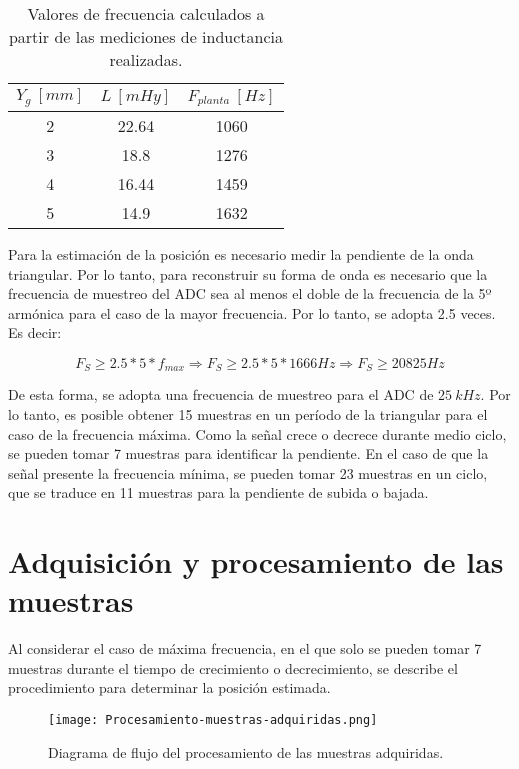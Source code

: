 \begin{table}[H]
	\begin{center}
		\begin{tabular}{| c | c | c |}
			\hline
			$Y_g\:[mm]$ & $L\:[mHy]$ & $F_{planta}\:[Hz]$\\ \hline
			2 & 22.64 & 1060\\ \hline
			3 & 18.8 & 1276\\ \hline
			4 & 16.44 & 1459\\ \hline
			5 & 14.9 & 1632\\ \hline
		\end{tabular}
		\caption{Valores de frecuencia calculados a partir de las mediciones de inductancia realizadas.}
		\label{frecuencias-calculadas}
	\end{center}
\end{table}


\noindent Para la estimación de la posición es necesario medir la pendiente de la onda triangular. Por lo tanto, para reconstruir su forma de onda es necesario que la frecuencia de muestreo del ADC sea al menos el doble de la frecuencia de la 5º armónica para el caso de la mayor frecuencia. Por lo tanto, se adopta 2.5 veces. Es decir:

\begin{equation} 
	F_S \geq 2.5 * 5 * f_{max} \Rightarrow  F_S \geq 2.5 * 5 * 1666 Hz \Rightarrow F_S \geq 20825 Hz
\end{equation}

\noindent De esta forma, se adopta una frecuencia de muestreo para el ADC de  $25 \:kHz$. Por lo tanto, es posible obtener 15 muestras en un período de la triangular para el caso de la frecuencia máxima. Como la señal crece o decrece durante medio ciclo, se pueden tomar 7 muestras para identificar la pendiente. En el caso de que la señal presente la frecuencia mínima, se pueden tomar 23 muestras en un ciclo, que se traduce en 11 muestras para la pendiente de subida o bajada. 


\section{Adquisición y procesamiento de las muestras}

\noindent Al considerar el caso de máxima frecuencia, en el que solo se pueden tomar 7 muestras durante el tiempo de crecimiento o decrecimiento, se describe el procedimiento para determinar la posición estimada.


\begin{figure}[H]
	\centering
	\texttt{[image: Procesamiento-muestras-adquiridas.png]}
	\caption{ Diagrama de flujo del procesamiento de las muestras adquiridas.}
	\label{fig:procesamiento-muestras-adquiridas}
\end{figure}


